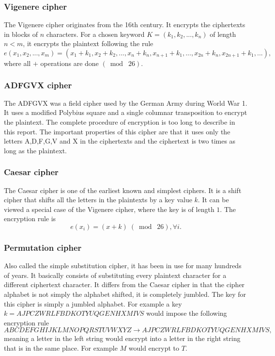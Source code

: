 \documentclass[a4paper]{article}
\begin{document}

\subsubsection*{Vigenere cipher}
The Vigenere cipher originates from the 16th century. It encrypts the ciphertexts in blocks of $n$ characters. For a chosen keyword $K = (k_{1}, k_{2}, ..., k_{n})$ of length $n < m$, it encrypts the plaintext following the rule
$$e(x_{1}, x_{2}, ...,x_{m}) = (x_{1}+k_{1}, x_{2}+k_{2}, ..., x_{n}+k_{n}, x_{n+1}+k_{1}, ...,x_{2n}+k_{n}, x_{2n+1} + k_{1}, ...),$$
where all $+$ operations are done $(\bmod\; 26)$.

\subsubsection*{ADFGVX cipher}
The ADFGVX was a field cipher used by the German Army during World War 1. It uses a modified Polybius square and a single columnar transposition to encrypt the plaintext. The complete procedure of encryption is too long to describe in this report. The important properties of this cipher are that it uses only the letters A,D,F,G,V and X in the ciphertexts and the ciphertext is two times as long as the plaintext. 

\subsubsection*{Caesar cipher}
The Caesar cipher is one of the earliest known and simplest ciphers. It is a shift cipher that shifts all the letters in the plaintexts by a key value $k$. It can be viewed a special case of the Vigenere cipher, where the key is of length $1$. The encryption rule is
$$e(x_{i}) = (x + k) \;(\bmod\; 26), \forall i.$$

\subsubsection*{Permutation cipher}
Also called the simple substitution cipher, it has been in use for many hundreds of years. It basically consists of substituting every plaintext character for a different ciphertext character. It differs from the Caesar cipher in that the cipher alphabet is not simply the alphabet shifted, it is completely jumbled. The key for this cipher is simply a jumbled alphabet. For example a key $k = AJPCZWRLFBDKOTYUQGENHXMIVS$ would impose the following encryption rule
$$ABCDEFGHIJKLMNOPQRSTUVWXYZ \rightarrow AJPCZWRLFBDKOTYUQGENHXMIVS,$$
meaning a letter in the left string would encrypt into a letter in the right string that is in the same place. For example $M$ would encrypt to $T$.
\end{document}
